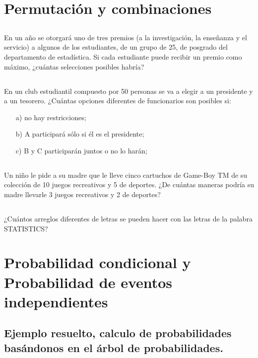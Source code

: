 \documentclass[11pt,letterpaper]{report}
\begin{document}
    \section{Permutación y combinaciones}
      \subsection{}
        En un año se otorgará uno de tres premios (a la investigación, la enseñanza y el servicio) a algunos de los estudiantes, de un grupo de 25, de posgrado del departamento de estadística. Si cada estudiante puede recibir un premio como máximo, ¿cuántas selecciones posibles habría?
      \subsection{}
        En un club estudiantil compuesto por 50 personas se va a elegir a un presidente y a un tesorero. ¿Cuántas opciones diferentes de funcionarios son posibles si:
        \begin{itemize}
            \item [a)] no hay restricciones;
            \item [b)] A participará sólo si él es el presidente;
            \item [c)] B y C participarán juntos o no lo harán;
        \end{itemize}
      \subsection{}
        Un niño le pide a su madre que le lleve cinco cartuchos de Game-Boy TM de su colección de 10 juegos recreativos y 5 de deportes. ¿De cuántas maneras podría su madre llevarle 3 juegos recreativos y 2 de deportes?
      \subsection{}
        ¿Cuántos arreglos diferentes de letras se pueden hacer con las letras de la palabra STATISTICS?
    \section{Probabilidad condicional y Probabilidad de eventos independientes}
      \subsection{Ejemplo resuelto, calculo de probabilidades basándonos en el árbol de probabilidades.}
\end{document}

